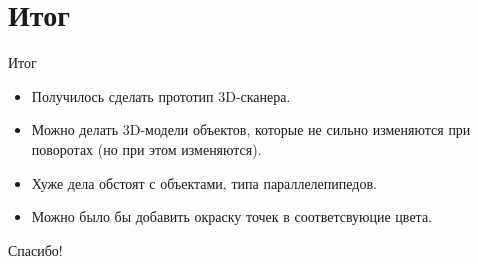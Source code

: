 \documentclass{beamer}
\begin{document}
\section{Итог}

\begin{frame}{Итог}
    \begin{center}
        \begin{itemize}
        \item
        Получилось сделать прототип 3D-сканера.
        \item
        Можно делать 3D-модели объектов, которые не сильно изменяются при поворотах (но при этом изменяются).
        \item
        Хуже дела обстоят с объектами, типа параллелепипедов.
        \item
        Можно было бы добавить окраску точек в соответсвуюцие цвета.
        \end{itemize}
    \end{center}
\end{frame}

\begin{frame}
\Huge{\centerline{Спасибо!}}
\end{frame}

\end{document}
